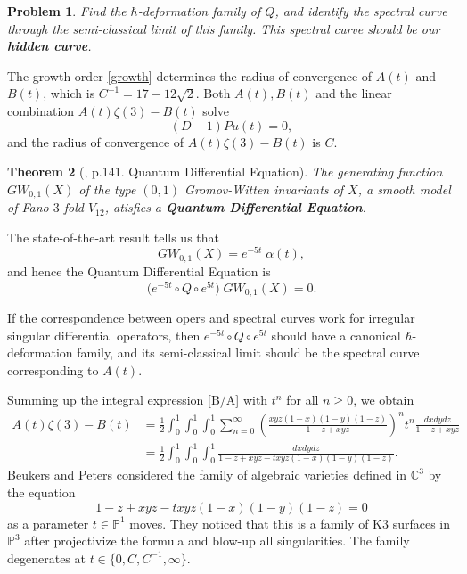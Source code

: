 \documentclass{amsart}
\newtheorem{thm}{Theorem}[section]
\newtheorem{prob}[thm]{Problem}
\theoremstyle{definition}
\numberwithin{equation}{section}
\numberwithin{figure}{section}
\def\a{\alpha}
\newcommand{\be}{\begin{equation}}
\newcommand{\ee}{\end{equation}}
\newcommand{\bP}{{\mathbb{P}}}
\newcommand{\bC}{{\mathbb{C}}}
\begin{document}
\begin{prob}
Find the $\hbar$-deformation family of $Q$, and 
identify the spectral curve through the semi-classical limit of this family. 
This spectral curve should be our \textbf{hidden curve}. 
\end{prob}




 
The growth order \eqref{growth} determines
the radius of  convergence of $A(t)$ and $B(t)$, which is
$C^{-1}=17-12\sqrt{2}$.
Both $A(t), B(t)$ and the linear combination $A(t)\zeta(3)-B(t)$
solve
\be
\label{D-1}
(D-1)Pu(t)=0,
\ee
and the radius of convergence of $A(t)\zeta(3)-B(t)$ is $C$.

\begin{thm}[\cite{CCGK}, p.141. Quantum Differential Equation]
The generating function $GW_{0,1}(X)$ of the type $(0,1)$ Gromov-Witten
invariants of $X$, a smooth model of Fano $3$-fold $V_{12}$, 
atisfies a \textbf{Quantum Differential Equation}.
\end{thm}


The state-of-the-art result \cite{GZ, Zagier} tells us that
$$
GW_{0,1}(X) = e^{-5t}\; \a(t), 
$$
and hence the  Quantum Differential Equation is
\be
\label{QDE}
\big(e^{-5t}\circ Q\circ e^{5t}\big) \;GW_{0,1}(X) = 0.
\ee




If the correspondence between opers and spectral curves work
for irregular singular differential operators, then $e^{-5t}\circ Q\circ e^{5t}$
should have a canonical $\hbar$-deformation family, and its
semi-classical limit should be the spectral curve corresponding to
$A(t)$. 


Summing up the integral expression \eqref{B/A} with $t^n$
for all $n\ge 0$, 
we obtain
\be
\begin{aligned}
\label{period}
A(t)\zeta(3)-B(t) &=  
 \frac{1}{2}\int_0^1\int_0^1\int_0^1
 \sum_{n=0}^\infty
\left(\frac{xyz(1-x)(1-y)(1-z)}{1-z+xyz}\right)^n t^n
 \frac{dxdydz}{1-z+xyz}\\
 &=
  \frac{1}{2}\int_0^1\int_0^1\int_0^1
  \frac{dxdydz}{1-z+xyz-txyz(1-x)(1-y)(1-z)}.
 \end{aligned}
\ee
Beukers and Peters \cite{BP} considered the family of algebraic varieties
defined in $\bC^3$ by the equation
$$
1-z+xyz-txyz(1-x)(1-y)(1-z) = 0
$$
as a parameter $t\in \bP^1$ moves. They noticed that this is a 
family of K3 surfaces in $\bP^3$ after projectivize the formula
and blow-up all singularities. The family degenerates at
$t\in \{0, C, C^{- 1}, \infty\}$.
\end{document}
